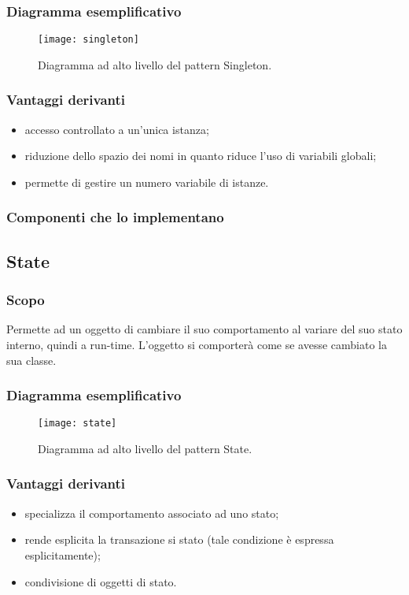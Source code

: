 \subsubsection{Diagramma esemplificativo}
\begin{figure}[h]
\centering
\texttt{[image: singleton]}
\caption{Diagramma ad alto livello del pattern Singleton.}\label{fig:singleton}
\end{figure}
\subsubsection{Vantaggi derivanti}
\begin{itemize}
\item accesso controllato a un'unica istanza;
\item riduzione dello spazio dei nomi in quanto riduce l'uso di variabili globali;
\item permette di gestire un numero variabile di istanze.
\end{itemize}
\subsubsection{Componenti che lo implementano}

\subsection{State}
\subsubsection{Scopo}
Permette ad un oggetto di cambiare il suo comportamento al variare del suo stato interno, quindi a run-time. L'oggetto si comporterà come se avesse cambiato la sua classe.
\subsubsection{Diagramma esemplificativo}
\begin{figure}[h]
\centering
\texttt{[image: state]}
\caption{Diagramma ad alto livello del pattern State.}\label{fig:state}
\end{figure}
\subsubsection{Vantaggi derivanti}
\begin{itemize}
\item specializza il comportamento associato ad uno stato;
\item rende esplicita la transazione si stato (tale condizione è espressa esplicitamente);
\item condivisione di oggetti di stato.
\end{itemize}
